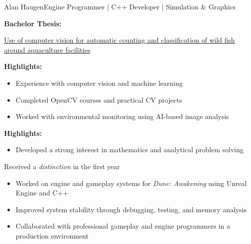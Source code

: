\documentclass{article}
\begin{document}
\begin{cv}[avatar]{Alan Haugen}{Engine Programmer | C++ Developer | Simulation \& Graphics}
\begin{cvevent}[2017][2020]

    \textbf{Bachelor Thesis:}
    
    \href{https://ntnuopen.ntnu.no/ntnu-xmlui/handle/11250/2664006}
    {Use of computer vision for automatic counting and classification of wild fish around aquaculture facilities}

    \textbf{Highlights:}
    \begin{itemize}
        \item Experience with computer vision and machine learning
        \item Completed OpenCV courses and practical CV projects
        \item Worked with environmental monitoring using AI-based image analysis
    \end{itemize}
\end{cvevent}

\begin{cvevent}[2016][2017]

    \textbf{Highlights:}
    \begin{itemize}
        \item Developed a strong interest in mathematics and analytical problem solving
    \end{itemize}
\end{cvevent}

\begin{cvevent}[2011][2014]

    Received a \emph{distinction} in the first year
\end{cvevent}


\begin{cvevent}[2026]

    \begin{itemize}
        \item Worked on engine and gameplay systems for \emph{Dune: Awakening} using Unreal Engine and C++
        \item Improved system stability through debugging, testing, and memory analysis
        \item Collaborated with professional gameplay and engine programmers in a production environment
    \end{itemize}
\end{cvevent}


\end{cv}
\end{document}
